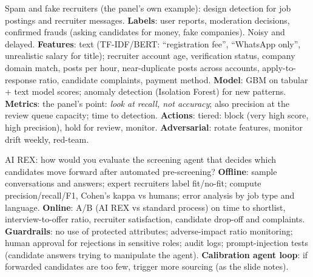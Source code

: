 \begin{qa}{\deep Spam and fake recruiters (the panel's own example): design detection for job postings and recruiter messages.}
\why
\textbf{Labels}: user reports, moderation decisions, confirmed frauds (asking candidates for money, fake companies). Noisy and delayed.
\textbf{Features}: text (TF-IDF/BERT: ``registration fee'', ``WhatsApp only'', unrealistic salary for title); recruiter account age, verification status, company domain match, posts per
hour, near-duplicate posts across accounts, apply-to-response ratio, candidate complaints, payment method.
\textbf{Model}: GBM on tabular + text model scores; anomaly detection (Isolation Forest) for new patterns.
\textbf{Metrics}: the panel's point: \emph{look at recall, not accuracy}; also precision at the review queue capacity; time to detection.
\textbf{Actions}: tiered: block (very high score, high precision), hold for review, monitor.
\textbf{Adversarial}: rotate features, monitor drift weekly, red-team.
\end{qa}

\begin{qa}{\deep AI REX: how would you evaluate the screening agent that decides which candidates move forward after automated pre-screening?}
\why
\textbf{Offline}: sample conversations and answers; expert recruiters label fit/no-fit; compute precision/recall/F1, Cohen's kappa vs humans; error analysis by job type and language.
\textbf{Online}: A/B (AI REX vs standard process) on time to shortlist, interview-to-offer ratio, recruiter satisfaction, candidate drop-off and complaints.
\textbf{Guardrails}: no use of protected attributes; adverse-impact ratio monitoring; human approval for rejections in sensitive roles; audit logs; prompt-injection tests (candidate answers trying
to manipulate the agent).
\textbf{Calibration agent loop}: if forwarded candidates are too few, trigger more sourcing (as the slide notes).
\end{qa}

